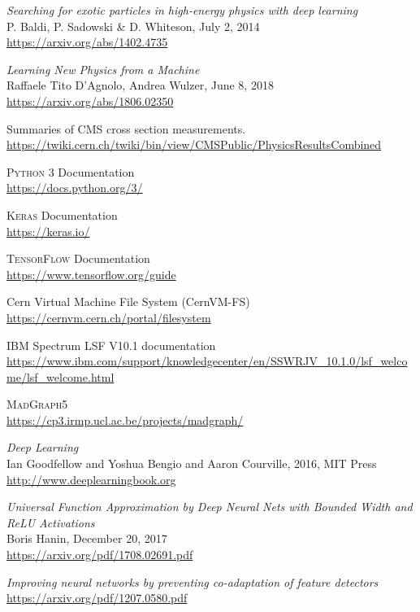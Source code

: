 \begin{thebibliography}{99}
\textit{Searching for exotic particles in high-energy physics with deep learning}
\\P. Baldi, P. Sadowski \& D. Whiteson, July 2, 2014
\\\url{https://arxiv.org/abs/1402.4735}

\textit{Learning New Physics from a Machine}
\\Raffaele Tito D'Agnolo, Andrea Wulzer, June 8, 2018
\\\url{https://arxiv.org/abs/1806.02350}

Summaries of CMS cross section measurements.
\\\url{https://twiki.cern.ch/twiki/bin/view/CMSPublic/PhysicsResultsCombined}

\textsc{Python 3} Documentation
\\\url{https://docs.python.org/3/}

\textsc{Keras} Documentation 
\\\url{https://keras.io/}
 
\textsc{TensorFlow} Documentation 
\\\url{https://www.tensorflow.org/guide}

Cern Virtual Machine File System (CernVM-FS)
\\\url{https://cernvm.cern.ch/portal/filesystem}

IBM Spectrum LSF V10.1 documentation
\\\url{https://www.ibm.com/support/knowledgecenter/en/SSWRJV_10.1.0/lsf_welcome/lsf_welcome.html}

\textsc{MadGraph5}
\\\url{https://cp3.irmp.ucl.ac.be/projects/madgraph/}
 
\textit{Deep Learning}
\\Ian Goodfellow and Yoshua Bengio and Aaron Courville, 2016, MIT Press
\\\url{http://www.deeplearningbook.org}

\textit{Universal Function Approximation by Deep Neural Nets with Bounded Width and ReLU Activations}
\\Boris Hanin, December 20, 2017
\\\url{https://arxiv.org/pdf/1708.02691.pdf}

\textit{Improving neural networks by preventing co-adaptation of feature detectors}
\\\url{https://arxiv.org/pdf/1207.0580.pdf}


\end{thebibliography}
